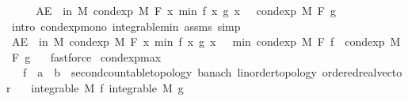 \begin{isabellebody}
\ \ \isamarkupfalse%
\ \isamarkupfalse%
\ {\isachardoublequoteopen}AE\ {\isasymxi}\ in\ M{\isachardot}{\kern0pt}\ cond{\isacharunderscore}{\kern0pt}exp\ M\ F\ {\isacharparenleft}{\kern0pt}{\isasymlambda}x{\isachardot}{\kern0pt}\ min\ {\isacharparenleft}{\kern0pt}f\ x{\isacharparenright}{\kern0pt}\ {\isacharparenleft}{\kern0pt}g\ x{\isacharparenright}{\kern0pt}{\isacharparenright}{\kern0pt}\ {\isasymxi}\ {\isasymle}\ cond{\isacharunderscore}{\kern0pt}exp\ M\ F\ g\ {\isasymxi}{\isachardoublequoteclose}\ \isamarkupfalse%
\ {\isacharparenleft}{\kern0pt}intro\ cond{\isacharunderscore}{\kern0pt}exp{\isacharunderscore}{\kern0pt}mono\ integrable{\isacharunderscore}{\kern0pt}min\ assms{\isacharcomma}{\kern0pt}\ simp{\isacharparenright}{\kern0pt}\isanewline
\ \ \isamarkupfalse%
\ \isamarkupfalse%
\ {\isachardoublequoteopen}AE\ {\isasymxi}\ in\ M{\isachardot}{\kern0pt}\ cond{\isacharunderscore}{\kern0pt}exp\ M\ F\ {\isacharparenleft}{\kern0pt}{\isasymlambda}x{\isachardot}{\kern0pt}\ min\ {\isacharparenleft}{\kern0pt}f\ x{\isacharparenright}{\kern0pt}\ {\isacharparenleft}{\kern0pt}g\ x{\isacharparenright}{\kern0pt}{\isacharparenright}{\kern0pt}\ {\isasymxi}\ {\isasymle}\ min\ {\isacharparenleft}{\kern0pt}cond{\isacharunderscore}{\kern0pt}exp\ M\ F\ f\ {\isasymxi}{\isacharparenright}{\kern0pt}\ {\isacharparenleft}{\kern0pt}cond{\isacharunderscore}{\kern0pt}exp\ M\ F\ g\ {\isasymxi}{\isacharparenright}{\kern0pt}{\isachardoublequoteclose}\ \isamarkupfalse%
\ fastforce\isanewline
{}\isamarkupfalse%
%
\endisatagproof
{\isafoldproof}%
%
\isadelimproof
\isanewline
%
\endisadelimproof
\isanewline
{}\isamarkupfalse%
\ cond{\isacharunderscore}{\kern0pt}exp{\isacharunderscore}{\kern0pt}max{\isacharcolon}{\kern0pt}\isanewline
\ \ \ f\ {\isacharcolon}{\kern0pt}{\isacharcolon}{\kern0pt}\ {\isachardoublequoteopen}{\isacharprime}{\kern0pt}a\ {\isasymRightarrow}\ {\isacharprime}{\kern0pt}b\ {\isacharcolon}{\kern0pt}{\isacharcolon}{\kern0pt}\ {\isacharbraceleft}{\kern0pt}second{\isacharunderscore}{\kern0pt}countable{\isacharunderscore}{\kern0pt}topology{\isacharcomma}{\kern0pt}\ banach{\isacharcomma}{\kern0pt}\ linorder{\isacharunderscore}{\kern0pt}topology{\isacharcomma}{\kern0pt}\ ordered{\isacharunderscore}{\kern0pt}real{\isacharunderscore}{\kern0pt}vector{\isacharbraceright}{\kern0pt}{\isachardoublequoteclose}\isanewline
\ \ \ {\isachardoublequoteopen}integrable\ M\ f{\isachardoublequoteclose}\ {\isachardoublequoteopen}integrable\ M\ g{\isachardoublequoteclose}\isanewline

\end{isabellebody}
